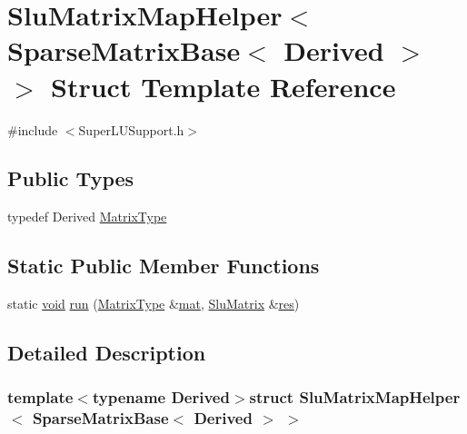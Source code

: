 \hypertarget{struct_slu_matrix_map_helper_3_01_sparse_matrix_base_3_01_derived_01_4_01_4}{\section{Slu\-Matrix\-Map\-Helper$<$ Sparse\-Matrix\-Base$<$ Derived $>$ $>$ Struct Template Reference}
\label{struct_slu_matrix_map_helper_3_01_sparse_matrix_base_3_01_derived_01_4_01_4}
}


{\ttfamily \#include $<$Super\-L\-U\-Support.\-h$>$}

\subsection*{Public Types}
\begin{DoxyCompactItemize}
\item 
typedef Derived \hyperlink{struct_slu_matrix_map_helper_3_01_sparse_matrix_base_3_01_derived_01_4_01_4_a03e73370fb00dab0623edcd04d8f22eb}{Matrix\-Type}
\end{DoxyCompactItemize}
\subsection*{Static Public Member Functions}
\begin{DoxyCompactItemize}
\item 
static \hyperlink{group___u_a_v_objects_plugin_ga444cf2ff3f0ecbe028adce838d373f5c}{void} \hyperlink{struct_slu_matrix_map_helper_3_01_sparse_matrix_base_3_01_derived_01_4_01_4_adc7649905104fbc267104610aa32619c}{run} (\hyperlink{struct_slu_matrix_map_helper_3_01_sparse_matrix_base_3_01_derived_01_4_01_4_a03e73370fb00dab0623edcd04d8f22eb}{Matrix\-Type} \&\hyperlink{uavobjecttemplate_8m_a16a51e808b16c46bbfd36da2e37cd123}{mat}, \hyperlink{struct_slu_matrix}{Slu\-Matrix} \&\hyperlink{glext_8h_a1dbb21208b9047cc8031ca9c840d3c2f}{res})
\end{DoxyCompactItemize}


\subsection{Detailed Description}
\subsubsection*{template$<$typename Derived$>$struct Slu\-Matrix\-Map\-Helper$<$ Sparse\-Matrix\-Base$<$ Derived $>$ $>$}



